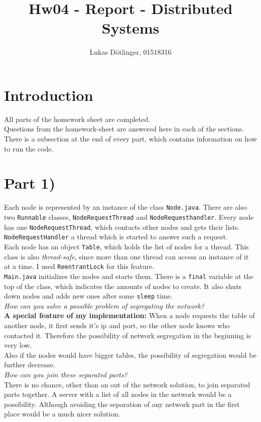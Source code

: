 \documentclass{article}
\begin{document}
  \title{Hw04 - Report - Distributed Systems}
  \date{}
  \author{Lukas Dötlinger, 01518316}
	
  \maketitle
  
  \section*{Introduction}
    
    All parts of the homework sheet are completed.\\
    Questions from the homework-sheet are answered here in each of the sections.
    There is a subsection at the end of every part, which contains information on how to run the code.\\
	
  \section*{Part 1)}
    
    Each node is represented by an instance of the class \texttt{Node.java}. There are also two \texttt{Runnable} classes, \texttt{NodeRequestThread} and \texttt{NodeRequesthandler}. Every node has one \texttt{NodeRequestThread}, which contacts other nodes and gets their lists. \texttt{NodeRequestHandler} a thread which is started to answer such a request.\\
    Each node has an object \texttt{Table}, which holds the list of nodes for a thread. This class is also \textit{thread-safe}, since more than one thread can access an instance of it at a time. I used \texttt{ReentrantLock} for this feature.\\
    \texttt{Main.java} initializes the nodes and starts them. There is a \texttt{final} variable at the top of the class, which indicates the amounts of nodes to create. It also shuts down nodes and adds new ones after some \texttt{sleep} time.\\
    \newline
    \textit{How can you solve a possible problem of segregating the network?}\\
	\textbf{A special feature of my implementation:} When a node requests the table of another node, it first sends it's ip and port, so the other node knows who contacted it. Therefore the possibility of network segregation in the beginning is very low.\\
	Also if the nodes would have bigger tables, the possibility of segregation would be further decrease.\\
	\newline
	\textit{How can you join these separated parts?}\\
	There is no chance, other than an out of the network solution, to join separated parts together. A server with a list of all nodes in the network would be a possibility. Although avoiding the separation of any network part in the first place would be a much nicer solution.\\	   
    
\end{document}
